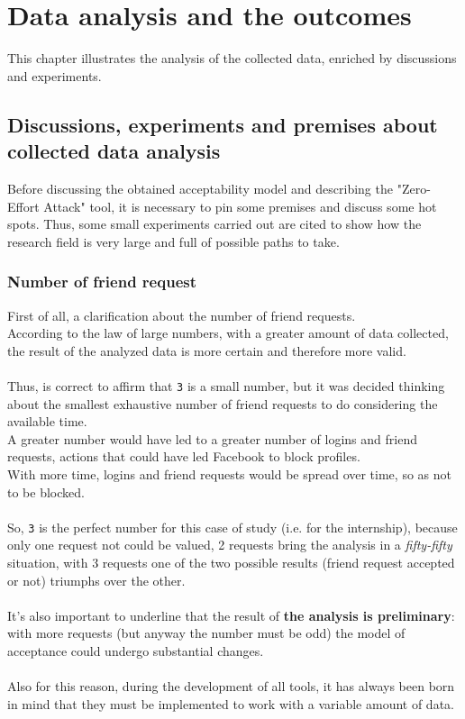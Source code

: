
\chapter{Data analysis and the outcomes}
\label{cap:data-analysis}
This chapter illustrates the analysis of the collected data, enriched by discussions and experiments.
\section{Discussions, experiments and premises about collected data analysis}
Before discussing the obtained acceptability model and describing the "Zero-Effort Attack" tool, it is necessary to pin some premises and discuss some hot spots. Thus, some small experiments carried out are cited to show how the research field is very large and full of possible paths to take.

\subsection{Number of friend request}
First of all, a clarification about the number of friend requests.\\
According to the law of large numbers, with a greater amount of data collected, the result of the analyzed data is more certain and therefore more valid.\\\\Thus, is correct to affirm that \texttt{3} is a small number, but it was decided thinking about the smallest exhaustive number of friend requests to do considering the available time.\\A greater number would have led to a greater number of logins and friend requests, actions that could have led Facebook to block profiles.\\With more time, logins and friend requests would be spread over time, so as not to be blocked.\\\\So, \texttt{3} is the perfect number for this case of study (i.e. for the internship), because only one request not could be valued, 2 requests bring the analysis in a \textit{fifty-fifty} situation, with 3 requests one of the two possible results (friend request accepted or not) triumphs over the other.\\\\It's also important to underline that the result of \textbf{the analysis is preliminary}: with more requests (but anyway the number must be odd) the model of acceptance could undergo substantial changes.\\\\Also for this reason, during the development of all tools, it has always been born in mind that they must be implemented to work with a variable amount of data.
